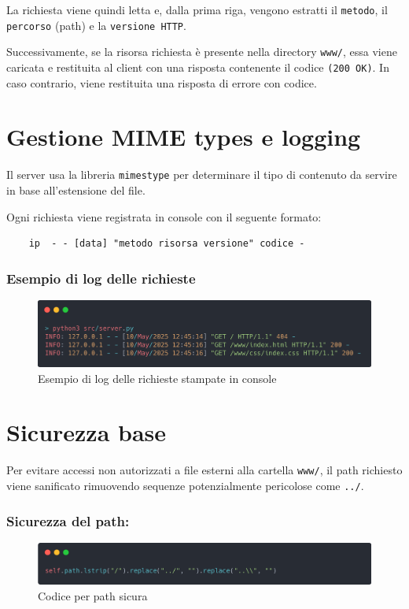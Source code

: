 \documentclass[a4paper,12pt]{report}
\begin{document}
La richiesta viene quindi letta e, dalla prima riga, vengono estratti il \texttt{metodo}, il \texttt{percorso} (path) e la \texttt{versione HTTP}.

Successivamente, se la risorsa richiesta è presente nella directory \texttt{www/}, essa viene caricata e restituita al client
con una risposta contenente il codice \texttt{(200 OK)}. In caso contrario, viene restituita una risposta di errore con
codice.


\section{Gestione MIME types e logging}
Il server usa la libreria \texttt{mimestype} per determinare il tipo di contenuto da servire in base all'estensione del
file.

Ogni richiesta viene registrata in console  con il seguente formato:

\begin{verbatim}
    ip  - - [data] "metodo risorsa versione" codice -
\end{verbatim}

\subsubsection{Esempio di log delle richieste}
\begin{figure}[H]
	\centering
	\includegraphics[width=1\textwidth]{img/logging.png}
	\caption{Esempio di log delle richieste stampate in console}
	\label{fig:logging}
\end{figure}

\section{Sicurezza base}

Per evitare accessi non autorizzati a file esterni alla cartella \texttt{www/}, il \newline path richiesto viene sanificato
rimuovendo sequenze potenzialmente pericolose come \texttt{../}.

\subsubsection{Sicurezza del path:}
\begin{figure}[H]
	\centering
	\includegraphics[width=1\textwidth]{img/safe_path.png}
	\caption{Codice per path sicura}
	\label{fig:safe_path}
\end{figure}
\end{document}
